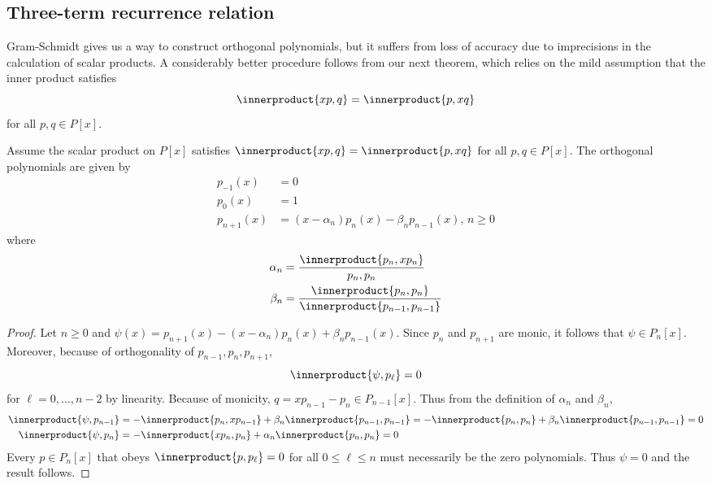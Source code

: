 \documentclass[a4paper]{article}
\newcommand*{\inner}{\innerproduct}
\begin{document}
\subsection{Three-term recurrence relation}

Gram-Schmidt gives us a way to construct orthogonal polynomials, but it suffers from loss of accuracy due to imprecisions in the calculation of scalar products. A considerably better procedure follows from our next theorem, which relies on the mild assumption that the inner product satisfies
\[
  \inner{xp, q} = \inner{p, xq}
\]
for all \(p, q \in P[x]\).

\begin{theorem}
  Assume the scalar product on \(P[x]\) satisfies \(\inner{xp, q} = \inner{p, xq}\) for all \(p, q \in P[x]\). The orthogonal polynomials are given by
  \begin{align*}
    p_{-1}(x) &= 0 \\
    p_{0}(x) &= 1 \\
    p_{n + 1}(x) &= (x - \alpha_n)p_n(x) - \beta_np_{n - 1}(x),\, n \geq 0
  \end{align*}
  where
  \begin{align*}
    \alpha_n &= \frac{\inner{p_n, xp_n}}{p_n, p_n} \\
    \beta_n &= \frac{\inner{p_n, p_n}}{\inner{p_{n - 1}, p_{n - 1}}}
  \end{align*}
\end{theorem}

\begin{proof}
  Let \(n \geq 0\) and \(\psi(x) = p_{n + 1}(x) - (x - \alpha_n)p_n(x) + \beta_np_{n - 1}(x)\). Since \(p_n\) and \(p_{n + 1}\) are monic, it follows that \(\psi \in P_n[x]\). Moreover, because of orthogonality of \(p_{n - 1}, p_n, p_{n + 1}\),
  \[
    \inner{\psi, p_\ell} = 0
  \]
  for \(\ell = 0, \dots, n - 2\) by linearity. Because of monicity, \(q = xp_{n - 1} - p_n \in P_{n - 1}[x]\). Thus from the definition of \(\alpha_n\) and \(\beta_n\),
  \begin{align*}
    \inner{\psi, p_{n - 1}} &= -\inner{p_n, xp_{n - 1}} + \beta_n\inner{p_{n - 1}, p_{n - 1}} = -\inner{p_n, p_n} + \beta_n\inner{p_{n - 1}, p_{n - 1}} = 0 \\
    \inner{\psi, p_n} &= -\inner{xp_n, p_n} + \alpha_n\inner{p_n, p_n} = 0
  \end{align*}
  Every \(p \in P_n[x]\) that obeys \(\inner{p, p_\ell} = 0\) for all \(0 \leq \ell \leq n\) must necessarily be the zero polynomials. Thus \(\psi = 0\) and the result follows.
\end{proof}
\end{document}
